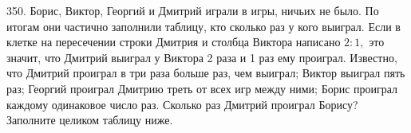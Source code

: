 350. Борис, Виктор, Георгий и Дмитрий играли в игры, ничьих не было. По итогам они частично заполнили таблицу, кто сколько раз у кого выиграл. Если в клетке на пересечении строки Дмитрия и столбца Виктора написано $2:1,$ это значит, что Дмитрий выиграл у Виктора 2 раза и 1 раз ему проиграл. Известно, что Дмитрий проиграл в три раза больше раз, чем выиграл; Виктор выиграл пять раз; Георгий проиграл Дмитрию треть от всех игр между ними; Борис проиграл каждому одинаковое число раз. Сколько раз Дмитрий проиграл Борису? Заполните целиком таблицу ниже.\\
\begin{figure}[ht!]
\end{figure}\\
